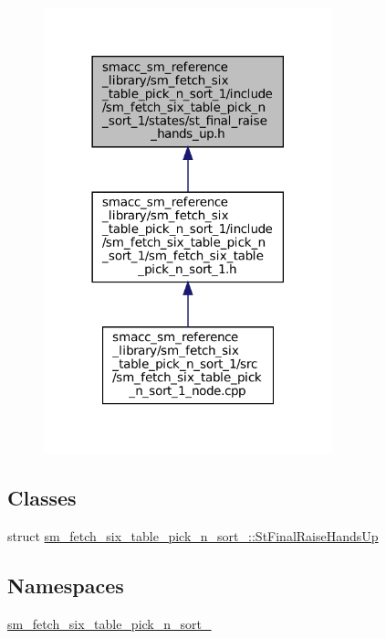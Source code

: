\begin{figure}[H]
\begin{center}
\leavevmode
\includegraphics[width=237pt]{sm__fetch__six__table__pick__n__sort__1_2include_2sm__fetch__six__table__pick__n__sort__1_2state960dd5a59a1cf4825175ecdf2234b4c1}
\end{center}
\end{figure}
\subsection*{Classes}
\begin{DoxyCompactItemize}
\item 
struct \hyperlink{structsm__fetch__six__table__pick__n__sort__1_1_1StFinalRaiseHandsUp}{sm\+\_\+fetch\+\_\+six\+\_\+table\+\_\+pick\+\_\+n\+\_\+sort\+\_\+::\+St\+Final\+Raise\+Hands\+Up}
\end{DoxyCompactItemize}
\subsection*{Namespaces}
\begin{DoxyCompactItemize}
\item 
 \hyperlink{namespacesm__fetch__six__table__pick__n__sort__1}{sm\+\_\+fetch\+\_\+six\+\_\+table\+\_\+pick\+\_\+n\+\_\+sort\+\_}
\end{DoxyCompactItemize}
